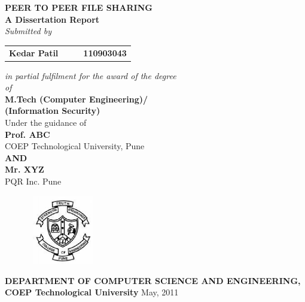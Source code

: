 \begin{titlepage}
\begin{center}
\LARGE{\bf{PEER TO PEER FILE SHARING\\}}	%
\vspace{10pt}
\Large{\bf{A Dissertation Report\\}}		%
\Large{\em{Submitted by\\}}
\begin{table}[htbp]
	\begin{center}
	\begin{tabular}{ l c c l }
	\Large\bf{Kedar Patil} & & & \Large\bf{110903043} \\[0.3cm] 

	\end{tabular}
	\end{center}
	\end{table}
\Large{\em{in partial fulfilment for the award of the degree\\ \vspace{1.5pt}of\\}}
\LARGE{\bf{M.Tech  (Computer Engineering)/\\ (Information Security)\\}}%
\vspace{20pt}
\Large{Under the guidance of\\ }
\Large{\bf{Prof. ABC }\\}
\Large{COEP Technological University, Pune\\}
\vspace{10pt}
\large{\bf{AND}\\}	%
\vspace{10pt}
\Large{\bf{Mr. XYZ}\\}
\Large{PQR Inc. Pune\\}
\vspace{10pt}
\begin{figure}[h]
\centering
\includegraphics[width=3cm,height=3cm]{coeplogo.eps}
\end{figure}
\Large{\bf{DEPARTMENT OF COMPUTER SCIENCE AND ENGINEERING,\\ 
COEP Technological University}}
\vfill
\large{May, 2011}
\end{center}
\end{titlepage}
